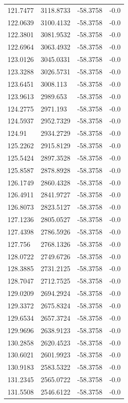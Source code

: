 \begin{table}[H]
\begin{tabular}{llll}
121.7477 & 3118.8733 & -58.3758 & -0.0 \\
122.0639 & 3100.4132 & -58.3758 & -0.0 \\
122.3801 & 3081.9532 & -58.3758 & -0.0 \\
122.6964 & 3063.4932 & -58.3758 & -0.0 \\
123.0126 & 3045.0331 & -58.3758 & -0.0 \\
123.3288 & 3026.5731 & -58.3758 & -0.0 \\
123.6451 & 3008.113 & -58.3758 & -0.0 \\
123.9613 & 2989.653 & -58.3758 & -0.0 \\
124.2775 & 2971.193 & -58.3758 & -0.0 \\
124.5937 & 2952.7329 & -58.3758 & -0.0 \\
124.91 & 2934.2729 & -58.3758 & -0.0 \\
125.2262 & 2915.8129 & -58.3758 & -0.0 \\
125.5424 & 2897.3528 & -58.3758 & -0.0 \\
125.8587 & 2878.8928 & -58.3758 & -0.0 \\
126.1749 & 2860.4328 & -58.3758 & -0.0 \\
126.4911 & 2841.9727 & -58.3758 & -0.0 \\
126.8073 & 2823.5127 & -58.3758 & -0.0 \\
127.1236 & 2805.0527 & -58.3758 & -0.0 \\
127.4398 & 2786.5926 & -58.3758 & -0.0 \\
127.756 & 2768.1326 & -58.3758 & -0.0 \\
128.0722 & 2749.6726 & -58.3758 & -0.0 \\
128.3885 & 2731.2125 & -58.3758 & -0.0 \\
128.7047 & 2712.7525 & -58.3758 & -0.0 \\
129.0209 & 2694.2924 & -58.3758 & -0.0 \\
129.3372 & 2675.8324 & -58.3758 & -0.0 \\
129.6534 & 2657.3724 & -58.3758 & -0.0 \\
129.9696 & 2638.9123 & -58.3758 & -0.0 \\
130.2858 & 2620.4523 & -58.3758 & -0.0 \\
130.6021 & 2601.9923 & -58.3758 & -0.0 \\
130.9183 & 2583.5322 & -58.3758 & -0.0 \\
131.2345 & 2565.0722 & -58.3758 & -0.0 \\
131.5508 & 2546.6122 & -58.3758 & -0.0 \\

\end{tabular}
\end{table}
